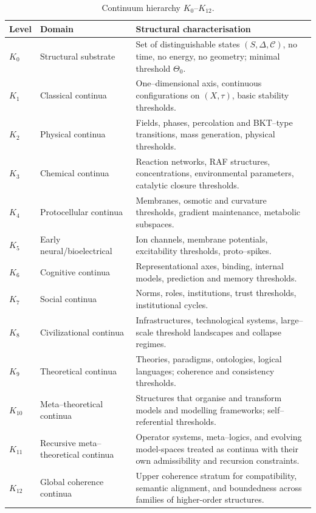 \begin{table}[htbp]
  \centering
  \caption{Continuum hierarchy \texorpdfstring{\(K_0\)}{K_0}–\(K_{12}\).}
  \label{tab:klevels-overview}
  \begin{tabular}{@{}L{0.08\textwidth}L{0.18\textwidth}L{0.58\textwidth}@{}}
    \hline
    Level & Domain & Structural characterisation \\
    \hline
    \(K_0\) & Structural substrate &
      Set of distinguishable states \((S,\Delta,\mathcal{C})\), no time,
      no energy, no geometry; minimal threshold \(\Theta_0\). \\[0.3em]
    \(K_1\) & Classical continua &
      One--dimensional axis, continuous configurations on \((X,\tau)\),
      basic stability thresholds. \\[0.3em]
    \(K_2\) & Physical continua &
      Fields, phases, percolation and BKT--type transitions, mass
      generation, physical thresholds. \\[0.3em]
    \(K_3\) & Chemical continua &
      Reaction networks, RAF structures, concentrations, environmental
      parameters, catalytic closure thresholds. \\[0.3em]
    \(K_4\) & Protocellular continua &
      Membranes, osmotic and curvature thresholds, gradient maintenance,
      metabolic subspaces. \\[0.3em]
    \(K_5\) & Early neural/\allowbreak bioelectrical &
      Ion channels, membrane potentials, excitability thresholds, proto--spikes. \\[0.3em]
    \(K_6\) & Cognitive continua &
      Representational axes, binding, internal models, prediction and
      memory thresholds. \\[0.3em]
    \(K_7\) & Social continua &
      Norms, roles, institutions, trust thresholds, institutional cycles. \\[0.3em]
    \(K_8\) & Civilizational continua &
      Infrastructures, technological systems, large--scale threshold
      landscapes and collapse regimes. \\[0.3em]
    \(K_9\) & Theoretical continua &
      Theories, paradigms, ontologies, logical languages; coherence and
      consistency thresholds. \\[0.3em]
    \(K_{10}\) & Meta--theoretical continua &
      Structures that organise and transform models and modelling
      frameworks; self--referential thresholds. \\[0.3em]
    \(K_{11}\) & Recursive meta--theoretical continua &
      Operator systems, meta--logics, and evolving model-spaces treated as
      continua with their own admissibility and recursion constraints. \\[0.3em]
    \(K_{12}\) & Global coherence continua &
      Upper coherence stratum for compatibility, semantic alignment, and
      boundedness across families of higher-order structures. \\
    \hline
  \end{tabular}
\end{table}

